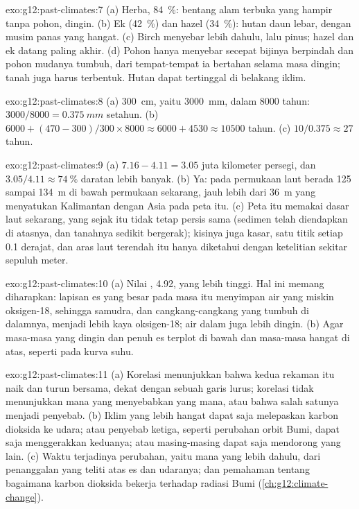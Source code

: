 \begin{solution}{exo:g12:past-climates:7}
(a) Herba, \qty{84}{\percent}: bentang alam terbuka yang hampir tanpa pohon,
dingin. (b) Ek (\qty{42}{\percent}) dan hazel (\qty{34}{\percent}): hutan daun
lebar, dengan musim panas yang hangat. (c) Birch menyebar lebih dahulu, lalu
pinus; hazel dan ek datang paling akhir. (d) Pohon hanya menyebar secepat
bijinya berpindah dan pohon mudanya tumbuh, dari tempat-tempat ia bertahan
selama masa dingin; tanah juga harus terbentuk. Hutan dapat tertinggal di
belakang iklim.
\end{solution}

\begin{solution}{exo:g12:past-climates:8}
(a) \qty{300}{cm}, yaitu \qty{3000}{mm}, dalam \num{8000} tahun: $3000/8000 =
\qty{0.375}{mm}$ setahun. (b) $\num{6000} + (470 - 300)/300 \times \num{8000}
\approx \num{6000} + \num{4530} \approx \num{10500}$ tahun. (c) $10/0.375
\approx 27$ tahun.
\end{solution}

\begin{solution}{exo:g12:past-climates:9}
(a) $7.16 - 4.11 = 3.05$ juta kilometer persegi, dan $3.05/4.11 \approx
\qty{74}{\percent}$ daratan lebih banyak. (b) Ya: pada  permukaan laut berada 125 sampai \qty{134}{m} di bawah permukaan
sekarang, jauh lebih dari \qty{36}{m} yang menyatukan Kalimantan dengan Asia
pada peta itu. (c) Peta itu memakai dasar laut sekarang, yang sejak itu tidak
tetap persis sama (sedimen telah diendapkan di atasnya, dan tanahnya sedikit
bergerak); kisinya juga kasar, satu titik setiap 0.1 derajat, dan aras laut
terendah itu hanya diketahui dengan ketelitian sekitar sepuluh meter.
\end{solution}

\begin{solution}{exo:g12:past-climates:10}
(a) Nilai , \qty{4.92}{\permil}, yang lebih tinggi.
Hal ini memang diharapkan: lapisan es yang besar pada masa itu menyimpan air
yang miskin oksigen-18, sehingga samudra, dan cangkang-cangkang yang tumbuh di
dalamnya, menjadi lebih kaya oksigen-18; air dalam juga lebih dingin. (b) Agar
masa-masa yang dingin dan penuh es terplot di bawah dan masa-masa hangat di
atas, seperti pada kurva suhu.
\end{solution}

\begin{solution}{exo:g12:past-climates:11}
(a) Korelasi menunjukkan bahwa kedua rekaman itu naik dan turun bersama, dekat
dengan sebuah garis lurus; korelasi tidak menunjukkan mana yang menyebabkan
yang mana, atau bahwa salah satunya menjadi penyebab. (b) Iklim yang lebih
hangat dapat saja melepaskan karbon dioksida ke udara; atau penyebab ketiga,
seperti perubahan orbit Bumi, dapat saja menggerakkan keduanya; atau
masing-masing dapat saja mendorong yang lain. (c) Waktu terjadinya perubahan,
yaitu mana yang lebih dahulu, dari penanggalan yang teliti atas es dan
udaranya; dan pemahaman tentang bagaimana karbon dioksida bekerja terhadap
radiasi Bumi (\cref{ch:g12:climate-change}).
\end{solution}

